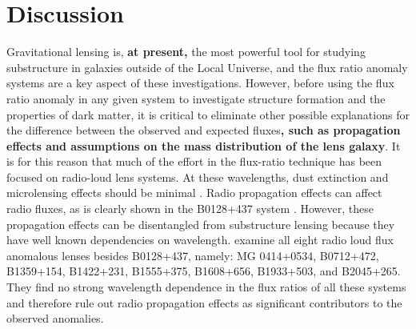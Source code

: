 \documentclass[useAMS,usenatbib]{mn2e}
\begin{document}
\section{Discussion}

Gravitational lensing is, {\bf at present,} the most powerful tool for
studying substructure in galaxies outside of the Local Universe, and
the flux ratio anomaly systems are a key aspect of these
investigations.  However, before using the flux ratio anomaly in any
given system to investigate structure formation and the properties of
dark matter, it is critical to eliminate other possible explanations
for the difference between the observed and expected fluxes{\bf, such as propagation effects and assumptions on the mass distribution of the lens galaxy}.  
It is for this reason that much of the effort in the flux-ratio technique
has been focused on radio-loud lens systems.  At these wavelengths,
dust extinction and microlensing effects should be minimal
\citep[although see][for a rare example of radio microlensing]{K2000}.
Radio propagation effects can affect radio fluxes, as is clearly shown
in the B0128+437 system \citep{B04}.  However, these propagation
effects can be disentangled from substructure lensing because they
have well known dependencies on wavelength. \citet{KD04} examine all
eight radio loud flux anomalous lenses besides B0128+437, namely: MG
0414+0534, B0712+472, B1359+154, B1422+231, B1555+375, B1608+656,
B1933+503, and B2045+265.  They find no strong wavelength dependence
in the flux ratios of all these systems and therefore rule out radio
propagation effects as significant contributors to the observed
anomalies.
\end{document}
